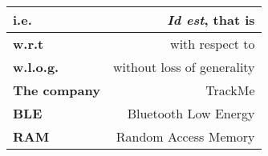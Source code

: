 \renewcommand{\arraystretch}{1.5}
\begin{center}
    \begin{tabular}{|l|r|}
        \hline
        \textbf{i.e.} & \textit{Id est}, that is  \\
        \hline
        \textbf{w.r.t} & with respect to  \\
        \hline
        \textbf{w.l.o.g.} & without loss of generality \\
        \hline
        \textbf{The company} & TrackMe \\
        \hline
        \textbf{BLE} & Bluetooth Low Energy \\
        \hline
        \textbf{RAM} & Random Access Memory \\
        \hline
    \end{tabular}
\end{center}